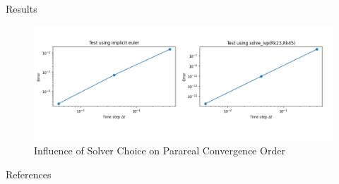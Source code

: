 \documentclass[aspectratio=169,xcolor=dvipsnames, t]{beamer}
\begin{document}
\begin{frame}{Results}
    \begin{figure}[ht!]
    \centering
    \includegraphics[width=1\textwidth]{figures/order_converge.png}
    \caption{Influence of Solver Choice on Parareal Convergence Order}
    \label{fig:9}
\end{figure}
\end{frame}

\begin{frame}[allowframebreaks]{References}
    \nocite{*}
    
	\small
\end{frame}

\makefinalpage
\end{document}
